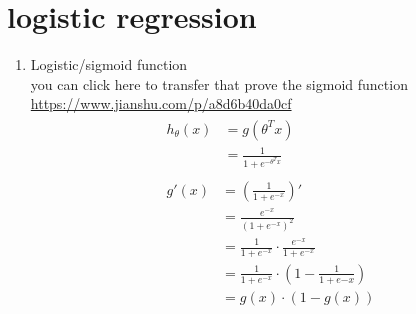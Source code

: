 \documentclass[12pt]{ctexart}%
\begin{document}
	\section{\quad logistic regression}
		\begin{enumerate}
			\item Logistic/sigmoid function\\
				you can click here to transfer that prove the sigmoid function  \url{https://www.jianshu.com/p/a8d6b40da0cf}
				\begin{align}
					\begin{split}
						h_\theta(x) &= g(\theta^T x) \\
									&= \frac{1}{1+e^{-\theta^T x}}
					\end{split}\\
					\begin{split}
						g'(x) &= (\frac{1}{1+e^{-x}})' \\
							  &= \frac{e^{-x}}{(1+e^{-x})^2}\\
							  &= \frac{1}{1+e^{-x}}\cdot\frac{e^{-x}}{1+e^{-x}}\\
							  &= \frac{1}{1+e^{-x}}\cdot(1 - \frac{1}{1+e{-x}})\\
							  &= g(x)\cdot (1-g(x))
					\end{split}\\
				\end{align}
			

\end{enumerate}
\end{document}
